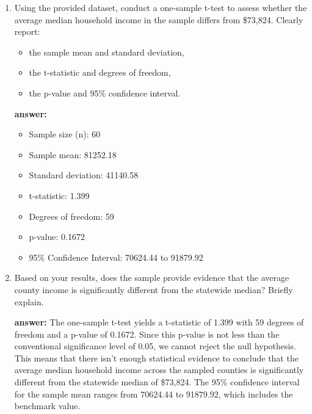 \documentclass[12pt]{article}
\begin{document}
\begin{enumerate}[label=\alph*)]
\item Using the provided dataset, conduct a one-sample t-test to assess whether the average median household income in the sample differs from \$73{,}824. Clearly report:
\begin{itemize}
\item the sample mean and standard deviation,
\item the t-statistic and degrees of freedom,
\item the p-value and 95\% confidence interval.
\end{itemize}


\textbf{answer:}
\begin{itemize}
    \item Sample size (n): 60
    \item Sample mean: 81252.18 
    \item Standard deviation: 41140.58
    \item t-statistic: 1.399 
    \item Degrees of freedom: 59
    \item p-value:  0.1672  
    \item 95\% Confidence Interval: 70624.44 to 91879.92
\end{itemize}

\item Based on your results, does the sample provide evidence that the average county income is significantly different from the statewide median? Briefly explain.

\textbf{answer:}
The one-sample t-test yields a t-statistic of  1.399  with 59 degrees of freedom and a p-value of 0.1672. Since this p-value is not less than the conventional significance level of 0.05, we cannot reject the null hypothesis.\\

This means that there isn't enough statistical evidence to conclude that the average median household income across the sampled counties is significantly different from the statewide median of \$73,824. The 95\% confidence interval for the sample mean ranges from 70624.44 to 91879.92, which includes the benchmark value.

\end{enumerate}
\end{document}
